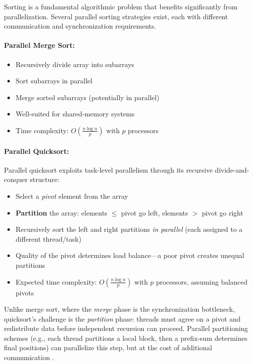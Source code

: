 Sorting is a fundamental algorithmic problem that benefits significantly from parallelization. Several parallel sorting strategies exist, each with different communication and synchronization requirements.

\paragraph*{Parallel Merge Sort:}
\begin{itemize}
    \item Recursively divide array into subarrays
    \item Sort subarrays in parallel
    \item Merge sorted subarrays (potentially in parallel)
    \item Well-suited for shared-memory systems
    \item Time complexity: $O(\frac{n \log n}{p})$ with $p$ processors
\end{itemize}

\paragraph*{Parallel Quicksort:}
Parallel quicksort \citep{sanders2019sequential} exploits task-level parallelism through its recursive divide-and-conquer structure:
\begin{itemize}
    \item Select a \emph{pivot} element from the array
    \item \textbf{Partition} the array: elements $\leq$ pivot go left, elements $>$ pivot go right
    \item Recursively sort the left and right partitions \emph{in parallel} (each assigned to a different thread/task)
    \item Quality of the pivot determines load balance---a poor pivot creates unequal partitions
    \item Expected time complexity: $O\!\left(\frac{n \log n}{p}\right)$ with $p$ processors, assuming balanced pivots
\end{itemize}
Unlike merge sort, where the \emph{merge} phase is the synchronization bottleneck, quicksort's challenge is the \emph{partition} phase: threads must agree on a pivot and redistribute data before independent recursion can proceed. Parallel partitioning schemes (e.g., each thread partitions a local block, then a prefix-sum determines final positions) can parallelize this step, but at the cost of additional communication \citep{sanders2019sequential}.

